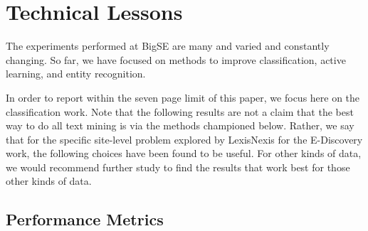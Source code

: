 \documentclass{sig-alternate-05-2015}
\newcommand{\bi}{\begin{itemize*}}
\newcommand{\ei}{\end{itemize*}}
\theoremstyle{break}
\begin{document}
\section{Technical Lessons}
\label{sect:Method}
The experiments performed at BigSE are many and varied and constantly
changing. So far, we have focused on 
methods to improve classification, active learning, and entity
recognition. 

In order to report within
the seven page limit of this paper, we focus here on the
classification work. 
Note that the following results are not a claim that the
best way to do all text mining is via the methods
championed below. Rather, we say that for the specific site-level
problem explored by LexisNexis for the E-Discovery work,
the following choices have been found to be useful. For other
kinds of data, we would recommend further study to find
the results that work best for those other kinds of data.

\subsection{Performance Metrics}
\end{document}
